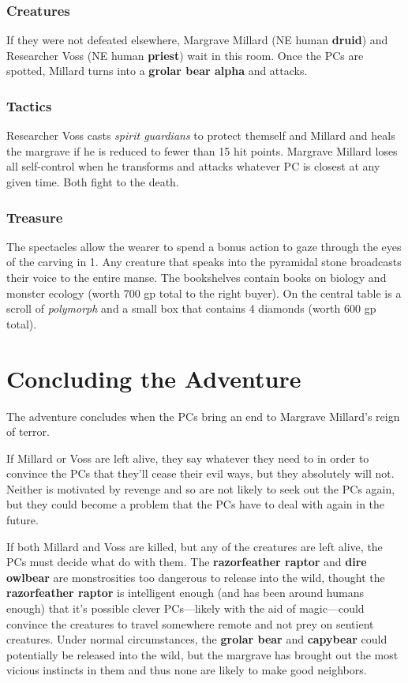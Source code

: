 \documentclass[10pt,a4paper,twoside,bg=print,twocolumn,openany,nodeprecatedcode]{dndbook}
\begin{document}
\subsubsection{Creatures}
If they were not defeated elsewhere, Margrave Millard (NE human \textbf{druid}) and Researcher Voss (NE human \textbf{priest}) wait in this room. Once the PCs are spotted, Millard turns into a \textbf{grolar bear alpha} and attacks.

\subsubsection{Tactics}
Researcher Voss casts \textit{spirit guardians} to protect themself and Millard and heals the margrave if he is reduced to fewer than 15 hit points. Margrave Millard loses all self-control when he transforms and attacks whatever PC is closest at any given time. Both fight to the death.

\subsubsection{Treasure}
The spectacles allow the wearer to spend a bonus action to gaze through the eyes of the carving in 1. Any creature that speaks into the pyramidal stone broadcasts their voice to the entire manse. The bookshelves contain books on biology and monster ecology (worth 700 gp total to the right buyer). On the central table is a scroll of \textit{polymorph} and a small box that contains 4 diamonds (worth 600 gp total).

\section{Concluding the Adventure}
The adventure concludes when the PCs bring an end to Margrave Millard's reign of terror.

If Millard or Voss are left alive, they say whatever they need to in order to convince the PCs that they'll cease their evil ways, but they absolutely will not. Neither is motivated by revenge and so are not likely to seek out the PCs again, but they could become a problem that the PCs have to deal with again in the future.

If both Millard and Voss are killed, but any of the creatures are left alive, the PCs must decide what do with them. The \textbf{razorfeather raptor} and \textbf{dire owlbear} are monstrosities too dangerous to release into the wild, thought the \textbf{razorfeather raptor} is intelligent enough (and has been around humans enough) that it's possible clever PCs—likely with the aid of magic—could convince the creatures to travel somewhere remote and not prey on sentient creatures. Under normal circumstances, the \textbf{grolar bear} and \textbf{capybear} could potentially be released into the wild, but the margrave has brought out the most vicious instincts in them and thus none are likely to make good neighbors.
\end{document}
